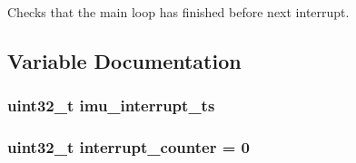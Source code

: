 \-Checks that the main loop has finished before next interrupt. 



\subsection{\-Variable \-Documentation}
\hypertarget{group__openshoe__runtime__framework_gabab0bf40697a144a8e46dfe6c4290656}{
\subsubsection[{imu\-\_\-interrupt\-\_\-ts}]{\setlength{\rightskip}{0pt plus 5cm}uint32\-\_\-t {\bf imu\-\_\-interrupt\-\_\-ts}}}
\label{group__openshoe__runtime__framework_gabab0bf40697a144a8e46dfe6c4290656}
\hypertarget{group__openshoe__runtime__framework_gae1dde88f49a15ac8b44d187ed1a2c2f4}{
\subsubsection[{interrupt\-\_\-counter}]{\setlength{\rightskip}{0pt plus 5cm}uint32\-\_\-t {\bf interrupt\-\_\-counter} = 0}}
\label{group__openshoe__runtime__framework_gae1dde88f49a15ac8b44d187ed1a2c2f4}
